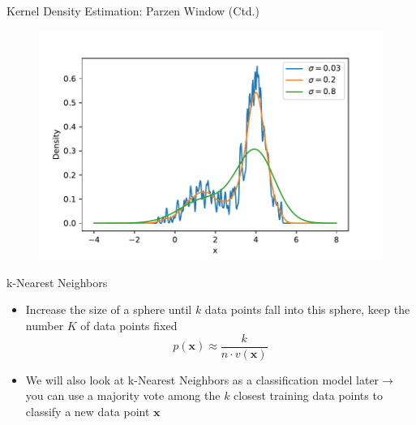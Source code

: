 \begin{frame}{Kernel Density Estimation: Parzen Window (Ctd.)}
	\begin{figure}
		\centering
		\includegraphics[scale=0.55]{04_density_estimation/02_img/kde}
	\end{figure}
\end{frame}


\begin{frame}{k-Nearest Neighbors}
	\begin{itemize}
		\item Increase the size of a sphere until $k$ data points fall into this sphere, keep the number $K$ of data points fixed
		\begin{equation}p(\bm{x}) \approx \frac{k}{n \cdot v(\bm{x})}\end{equation}
		\item We will also look at k-Nearest Neighbors as a classification model later\newline $\rightarrow$ you can use a majority vote among the $k$ closest training data points to classify a new data point $\bm{x}$
	\end{itemize}
\end{frame}


